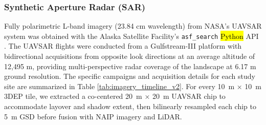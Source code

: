 \documentclass[remotesensing,article,accept,pdftex,moreauthors]{Definitions/mdpi}
\begin{document}
\subsubsection{Synthetic Aperture Radar (SAR)}
Fully polarimetric L-band imagery (23.84 cm wavelength) from NASA’s UAVSAR system was obtained with the Alaska Satellite Facility’s \texttt{asf\_search} \hl{Python} %
 API \citep{alaska_search}. The UAVSAR flights were conducted from a Gulfstream-III platform with bidirectional acquisitions from opposite look directions at an average altitude of 12,495 m, providing multi-perspective radar coverage of the landscape at 6.17 m ground resolution. The specific campaigns and acquisition details for each study site are summarized in Table \ref{tab:imagery_timeline_v2}. For every \SI{10}{m} × \SI{10}{m} 3DEP tile, we extracted a co-centered \SI{20}{m} × \SI{20}{m} UAVSAR chip to accommodate layover and shadow extent, then bilinearly resampled each chip to \SI{5}{m} GSD before fusion with NAIP imagery and LiDAR.
\end{document}

